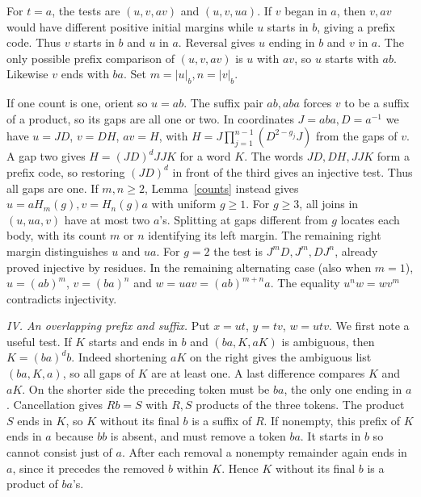 \documentclass[11pt,a4paper]{article}
\newcommand{\bct}[1]{\lvert #1\rvert_b}
\newcommand{\parhead}[1]{\par\smallskip\noindent\textit{#1.}\enspace}
\begin{document}
For $t=a$, the tests are $(u,v,av)$ and $(u,v,ua)$. If $v$ began in $a$, then $v,av$ would have different positive initial margins while $u$ starts in $b$, giving a prefix code. Thus $v$ starts in $b$ and $u$ in $a$. Reversal gives $u$ ending in $b$ and $v$ in $a$. The only possible prefix comparison of $(u,v,av)$ is $u$ with $av$, so $u$ starts with $ab$. Likewise $v$ ends with $ba$. Set $m=\bct u,n=\bct v$.

If one count is one, orient so $u=ab$. The suffix pair $ab,aba$ forces $v$ to be a suffix of a product, so its gaps are all one or two. In coordinates $J=aba,D=a^{-1}$ we have $u=JD$, $v=DH$, $av=H$, with $H=J\prod_{j=1}^{n-1}(D^{2-g_j}J)$ from the gaps of $v$. A gap two gives $H=(JD)^d JJ K$ for a word $K$. The words $JD,DH,JJ K$ form a prefix code, so restoring $(JD)^d$ in front of the third gives an injective test. Thus all gaps are one. If $m,n\ge2$, Lemma~\ref{counts} instead gives $u=aH_m(g),v=H_n(g)a$ with uniform $g\ge1$. For $g\ge3$, all joins in $(u,ua,v)$ have at most two $a$'s. Splitting at gaps different from $g$ locates each body, with its count $m$ or $n$ identifying its left margin. The remaining right margin distinguishes $u$ and $ua$. For $g=2$ the test is $J^mD,J^m,DJ^n$, already proved injective by residues. In the remaining alternating case (also when $m=1$), $u=(ab)^m$, $v=(ba)^n$ and $w=uav=(ab)^{m+n}a$. The equality $u^n w=w v^m$ contradicts injectivity.

\parhead{IV. An overlapping prefix and suffix}
Put $x=ut$, $y=tv$, $w=utv$. We first note a useful test. If $K$ starts and ends in $b$ and $(ba,K,aK)$ is ambiguous, then $K=(ba)^d b$. Indeed shortening $aK$ on the right gives the ambiguous list $(ba,K,a)$, so all gaps of $K$ are at least one. A last difference compares $K$ and $aK$. On the shorter side the preceding token must be $ba$, the only one ending in $a$. Cancellation gives $R b=S$ with $R,S$ products of the three tokens. The product $S$ ends in $K$, so $K$ without its final $b$ is a suffix of $R$. If nonempty, this prefix of $K$ ends in $a$ because $bb$ is absent, and must remove a token $ba$. It starts in $b$ so cannot consist just of $a$. After each removal a nonempty remainder again ends in $a$, since it precedes the removed $b$ within $K$. Hence $K$ without its final $b$ is a product of $ba$'s.
\end{document}
